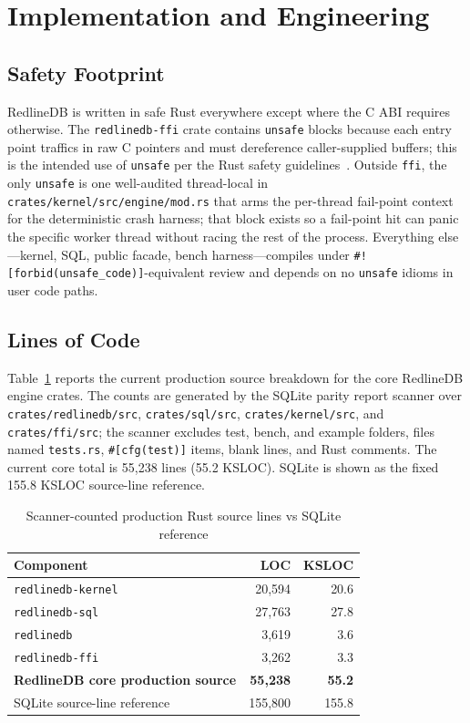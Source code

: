 \section{Implementation and Engineering}\label{sec:impl}

\subsection{Safety Footprint}
RedlineDB is written in safe Rust everywhere except where the C ABI
requires otherwise. The \texttt{redlinedb-ffi} crate contains
\texttt{unsafe} blocks because each entry point traffics in raw C
pointers and must dereference caller-supplied buffers; this is the
intended use of \texttt{unsafe} per the Rust safety
guidelines~\cite{rust_unsafe_guidelines,jung2021rustbelt}. Outside
\texttt{ffi}, the only \texttt{unsafe} is one well-audited
thread-local in \texttt{crates/kernel/src/engine/mod.rs} that arms
the per-thread fail-point context for the deterministic crash
harness; that block exists so a fail-point hit can panic the
specific worker thread without racing the rest of the
process. Everything else---kernel, SQL, public facade, bench
harness---compiles under \texttt{\#![forbid(unsafe\_code)]}-equivalent
review and depends on no \texttt{unsafe} idioms in user code paths.

\subsection{Lines of Code}
Table~\ref{tab:loc} reports the current production source
breakdown for the core RedlineDB engine crates. The counts are
generated by the SQLite parity report scanner over
\texttt{crates/redlinedb/src}, \texttt{crates/sql/src},
\texttt{crates/kernel/src}, and \texttt{crates/ffi/src}; the
scanner excludes test, bench, and example folders, files named
\texttt{tests.rs}, \texttt{\#[cfg(test)]} items, blank lines,
and Rust comments. The current
core total is 55{,}238 lines (55.2 KSLOC). SQLite is shown as the
fixed 155.8 KSLOC source-line reference.

\begin{table}[t]
\centering
\caption{Scanner-counted production Rust source lines vs SQLite reference}
\label{tab:loc}
\renewcommand{\arraystretch}{1.05}
\begin{tabular}{@{}lrr@{}}
\toprule
\textbf{Component} & \textbf{LOC} & \textbf{KSLOC} \\
\midrule
\texttt{redlinedb-kernel} & 20{,}594 & 20.6 \\
\texttt{redlinedb-sql} & 27{,}763 & 27.8 \\
\texttt{redlinedb} & 3{,}619 & 3.6 \\
\texttt{redlinedb-ffi} & 3{,}262 & 3.3 \\
\midrule
\textbf{RedlineDB core production source} & \textbf{55{,}238} & \textbf{55.2} \\
\midrule
SQLite source-line reference & 155{,}800 & 155.8 \\
\bottomrule
\end{tabular}
\end{table}

